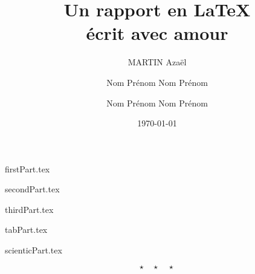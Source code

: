 \documentclass{rUTT}
\title{Un rapport en \LaTeX \\ écrit avec amour}
\date{\today}
\author{
    {\sc MARTIN} Azaël
    \and
    {\sc Nom} Prénom
    \break
    {\sc Nom} Prénom
    \and
    {\sc Nom} Prénom
    \break
    {\sc Nom} Prénom
    }
\begin{document}

    \frontpagereports %

    \tableofcontents %
    \listoffigures
    \listoftables

    \clearpage

    \justifying

    {firstPart.tex}

    \clearpage

    {secondPart.tex}

    \clearpage

    {thirdPart.tex}

    \clearpage

    {tabPart.tex}

    \clearpage

    {scienticPart.tex}


    \medskip %

    \[ \star \quad \star \quad \star \]

    \nocite{*} %

    {
    \RaggedRight %
    \sloppy
    \printbibliography[title={Bibliographie}]
    }
\end{document}
